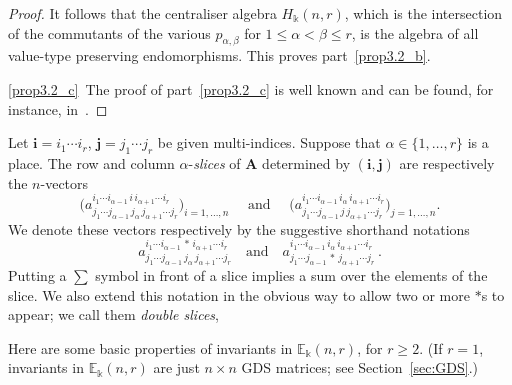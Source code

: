 \documentclass[ALCO,ThmDefs,Unicode,epreuves]{cedram}
\newcommand{\E}{\mathbb{E}}
\newcommand{\bi}{{\boldsymbol{i}}} %
\newcommand{\bj}{{\boldsymbol{j}}}
\newcommand{\qand}{\quad\text{and}\quad}
\newcommand{\bA}{\mathbf{A}}
\begin{document}
\begin{proof}
It follows that the centraliser algebra $H_\Bbbk(n,r)$, which is the
intersection of the commutants of the various $p_{\alpha,\beta}$ for
$1 \le \alpha < \beta \le r$, is the algebra of all value-type
preserving endomorphisms. This proves part~\ref{prop3.2_b}.

\ref{prop3.2_c}~The proof of part~\ref{prop3.2_c} is well known and can be found, for instance, in~\cite{Green:book}.
\end{proof}




\begin{defi}\label{def:slices}
Let $\bi = i_1 \cdots i_r$, $\bj = j_1 \cdots j_r$ be given
multi-indices. Suppose that $\alpha \in \{1, \dots, r\}$ is a
place. The row and column $\alpha$-\emph{slices} of $\bA$ determined
by $(\bi,\bj)$ are respectively the $n$-vectors
 \[
 \big( a^{i_1\cdots i_{\alpha-1} \,i\, i_{\alpha+1}\cdots
 i_r}_{j_1\cdots j_{\alpha-1} \, j_\alpha\, j_{\alpha+1}\cdots
 j_r}\big)_{i = 1, \dots, n} \quad \text{ and } \quad \big(
 a^{i_1\cdots i_{\alpha-1} \,i_\alpha\, i_{\alpha+1}\cdots
 i_r}_{j_1\cdots j_{\alpha-1} \,j\, j_{\alpha+1}\cdots j_r}
 \big)_{j = 1, \dots, n} .
 \]
We denote these vectors respectively by the suggestive shorthand
notations
 \[
 a^{i_1\cdots i_{\alpha-1} \,*\, i_{\alpha+1}\cdots i_r}_{j_1\cdots
 j_{\alpha-1} \, j_\alpha\, j_{\alpha+1}\cdots j_r} \qand a^{i_1\cdots
 i_{\alpha-1} \,i_\alpha\, i_{\alpha+1}\cdots i_r}_{j_1\cdots
 j_{\alpha-1} \,*\, j_{\alpha+1}\cdots j_r} \, .
 \]
Putting a $\sum$ symbol in front of a slice implies a sum over
the elements of the slice. We also extend this notation in the
obvious way to allow two or more $*$s to appear; we call them
\emph{double slices}, \etc
\end{defi}

Here are some basic properties of invariants in $\E_\Bbbk(n,r)$, for
$r \ge 2$. (If $r=1$, invariants in $\E_\Bbbk(n,r)$ are just $n
\times n$ GDS matrices; see Section~\ref{sec:GDS}.)
\end{document}
